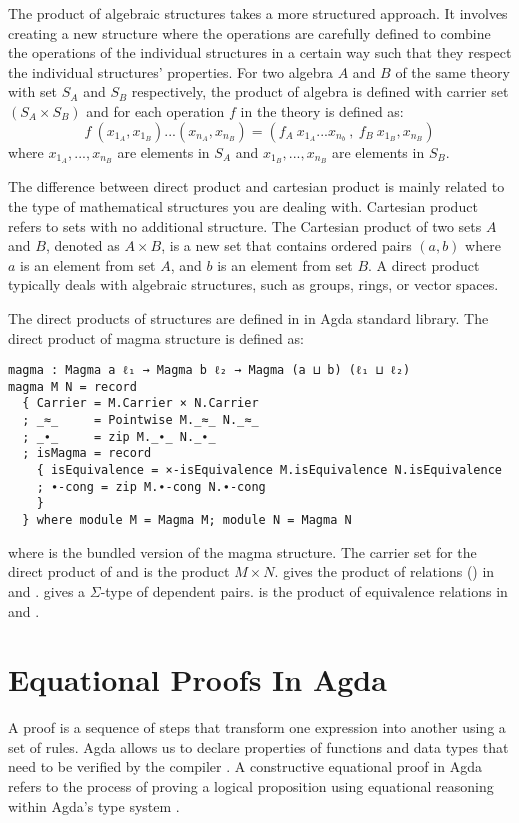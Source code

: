 The product of algebraic structures takes a more structured approach. It
involves creating a new structure where the operations are carefully defined to
combine the operations of the individual structures in a certain way such that
they respect the individual structures' properties. For two algebra $A$ and $B$
of the same theory with set $S_A$ and $S_B$ respectively, the product of algebra
is defined with carrier set $(S_A \times S_B)$ and for each operation $f$ in the
theory is defined as:
\[f\ (x_{1_A},x_{1_B})...(x_{n_A},x_{n_B}) = (f_A\ x_{1_A}...x_{n_b}\ ,\ f_B\
x_{1_B},x_{n_B} )\] where $x_{1_A},...,x_{n_B}$ are elements in $S_A$ and
$x_{1_B},...,x_{n_B}$ are elements in $S_B$. 

The difference between direct product and cartesian product is mainly related
to the type of mathematical structures you are dealing with. Cartesian product
refers to sets with no additional structure. The Cartesian product of two sets $A$
and $B$, denoted as $A × B$, is a new set that contains ordered pairs $(a, b)$ where
$a$ is an element from set $A$, and $b$ is an element from set $B$. A direct product
typically deals with algebraic structures, such as groups, rings, or vector
spaces.

The direct products of structures are defined in
 in Agda standard library. The direct
product of magma structure is defined as:

\begin{verbatim}
magma : Magma a ℓ₁ → Magma b ℓ₂ → Magma (a ⊔ b) (ℓ₁ ⊔ ℓ₂)
magma M N = record
  { Carrier = M.Carrier × N.Carrier
  ; _≈_     = Pointwise M._≈_ N._≈_
  ; _∙_     = zip M._∙_ N._∙_
  ; isMagma = record
    { isEquivalence = ×-isEquivalence M.isEquivalence N.isEquivalence
    ; ∙-cong = zip M.∙-cong N.∙-cong
    }
  } where module M = Magma M; module N = Magma N
\end{verbatim}

where  is the bundled version of the magma structure. The carrier
set for the direct product of  and  is the product $M \times N$.
\inline{Pointwise} gives the product of relations (\inline{_≈_}) in 
and \inline{N}. \inline{zip} gives a $\Sigma$-type of dependent pairs.
\inline{×-isEquivalence} is the product of equivalence relations in \inline{M}
and \inline{N}.

\section{Equational Proofs In Agda}
\label{proof}
A proof is a sequence of steps that transform one expression into another using
a set of rules. Agda allows us to declare properties of functions and data types
that need to be verified by the compiler \cite{kidney2020finiteness}. A
constructive equational proof in Agda refers to the process of proving a logical
proposition using equational reasoning within Agda's type system
\cite{murray2022constructive}. 


